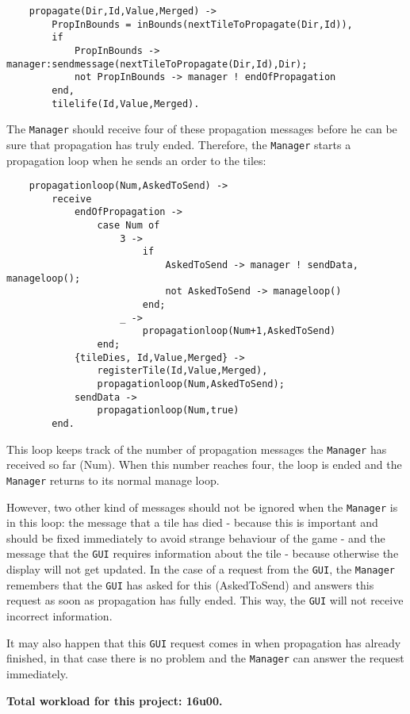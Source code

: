 \documentclass{taak}
\begin{document}
\begin{lstlisting}
	propagate(Dir,Id,Value,Merged) ->
		PropInBounds = inBounds(nextTileToPropagate(Dir,Id)),
		if 
			PropInBounds -> manager:sendmessage(nextTileToPropagate(Dir,Id),Dir);
			not PropInBounds -> manager ! endOfPropagation
		end,
		tilelife(Id,Value,Merged).
\end{lstlisting}

The \texttt{Manager} should receive four of these propagation messages before he can be sure that propagation has truly ended. Therefore, the \texttt{Manager} starts a propagation loop when he sends an order to the tiles:

\begin{lstlisting}
	propagationloop(Num,AskedToSend) ->
		receive
			endOfPropagation ->
				case Num of
					3 -> 
						if
							AskedToSend -> manager ! sendData, manageloop();
							not AskedToSend -> manageloop()
						end;
					_ -> 
						propagationloop(Num+1,AskedToSend)
				end;
			{tileDies, Id,Value,Merged} ->
				registerTile(Id,Value,Merged),
				propagationloop(Num,AskedToSend);
			sendData ->
				propagationloop(Num,true)
		end.
\end{lstlisting}

This loop keeps track of the number of propagation messages the \texttt{Manager} has received so far (Num). When this number reaches four, the loop is ended and the \texttt{Manager} returns to its normal manage loop.

However, two other kind of messages should not be ignored when the \texttt{Manager} is in this loop: the message that a tile has died - because this is important and should be fixed immediately to avoid strange behaviour of the game - and the message that the \texttt{GUI} requires information about the tile - because otherwise the display will not get updated. In the case of a request from the \texttt{GUI}, the \texttt{Manager} remembers that the \texttt{GUI} has asked for this (AskedToSend) and answers this request as soon as propagation has fully ended. This way, the \texttt{GUI} will not receive incorrect information.

It may also happen that this \texttt{GUI} request comes in when propagation has already finished, in that case there is no problem and the \texttt{Manager} can answer the request immediately.


\vspace{1cm}
\flushright
\textbf{Total workload for this project: 16u00.}
\end{document}

